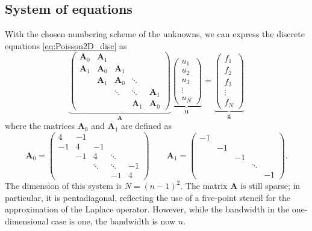 \subsection{System of equations}

With the chosen numbering scheme of the unknowns, we can express the discrete
equations \autoref{eq:Poisson2D_disc} as
\begin{equation}
  \underbrace{
    \begin{pmatrix}
      \bm A_0 & \bm A_1 & & & \\
      \bm A_1 & \bm A_0 & \bm A_1 & & \\
      & \bm A_1 & \bm A_0 & \ddots & \\
      & & \ddots & \ddots & \bm A_1 \\
      & & & \bm A_1 & \bm A_0
    \end{pmatrix}}_{\bm A}
  \underbrace{
    \begin{pmatrix}
      u_1 \\ u_2 \\ u_3 \\ \vdots \\ u_N
    \end{pmatrix}}_{\bm u}
  =
  \underbrace{
    \begin{pmatrix}
      f_1 \\ f_2 \\ f_3 \\ \vdots \\ f_N
    \end{pmatrix}}_{\bm g}
  \label{eq:Poisson2D_sys}
\end{equation}
where the matrices $\bm A_0$ and $\bm A_1$ are defined as
\begin{equation}
  \bm A_0 =
  \begin{pmatrix}
    4 & -1 & & & \\
    -1 & 4 & -1 & & \\
    & -1 & 4 & \ddots & \\
    & & \ddots & \ddots & -1 \\
    & & & -1 & 4
  \end{pmatrix}
  \qquad
  \bm A_1 =
  \begin{pmatrix}
    -1 & & & & \\
    & -1 & & & \\
    & & -1 & & \\
    & & & \ddots & \\
    & & & & -1
  \end{pmatrix}.
\end{equation}
The dimension of this system is $N=(n-1)^2$. The matrix $\bm A$ is still sparse;
in particular, it is pentadiagonal, reflecting the use of a five-point stencil
for the approximation of the Laplace operator. However, while the bandwidth in
the one-dimensional case is one, the bandwidth is now $n$.


